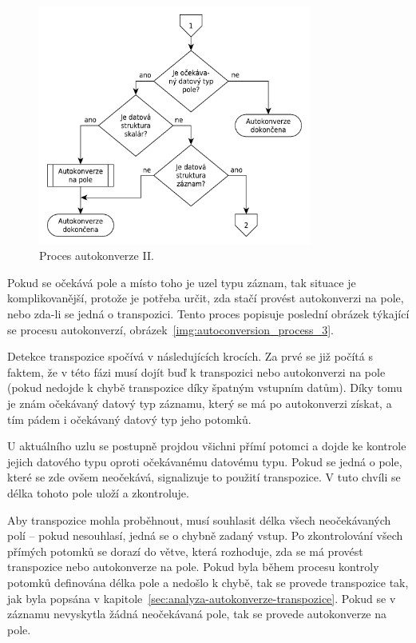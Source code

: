 \documentclass[FM,bw,DP]{tulthesis}
\begin{document}
\begin{figure}[h]
	\centering
    \includegraphics[width=0.8\textwidth]{../img/autoconversion_process_2.pdf}
    \caption{Proces autokonverze II.}
	\label{img:autoconversion_process_2}
\end{figure}

Pokud se očekává pole a místo toho je uzel typu záznam, tak situace je komplikovanější, protože je potřeba určit, zda stačí provést autokonverzi na pole, nebo zda-li se jedná o transpozici. Tento proces popisuje poslední obrázek týkající se procesu autokonverzí, obrázek~\ref{img:autoconversion_process_3}.

Detekce transpozice spočívá v následujících krocích. Za prvé se již počítá s faktem, že v této fázi musí dojít buď k transpozici nebo autokonverzi na pole (pokud nedojde k chybě transpozice díky špatným vstupním datům). Díky tomu je znám očekávaný datový typ záznamu, který se má po autokonverzi získat, a tím pádem i očekávaný datový typ jeho potomků.

U aktuálního uzlu se postupně projdou všichni přímí potomci a dojde ke kontrole jejich datového typu oproti očekávanému datovému typu. Pokud se jedná o pole, které se zde ovšem neočekává, signalizuje to použití transpozice. V tuto chvíli se délka tohoto pole uloží a zkontroluje.

Aby transpozice mohla proběhnout, musí souhlasit délka všech neočekávaných polí -- pokud nesouhlasí, jedná se o chybně zadaný vstup. Po zkontrolování všech přímých potomků se dorazí do větve, která rozhoduje, zda se má provést transpozice nebo autokonverze na pole. Pokud byla během procesu kontroly potomků definována délka pole a nedošlo k chybě, tak se provede transpozice tak, jak byla popsána v kapitole~\ref{sec:analyza-autokonverze-transpozice}. Pokud se v záznamu nevyskytla žádná neočekávaná pole, tak se provede autokonverze na pole.
\end{document}
